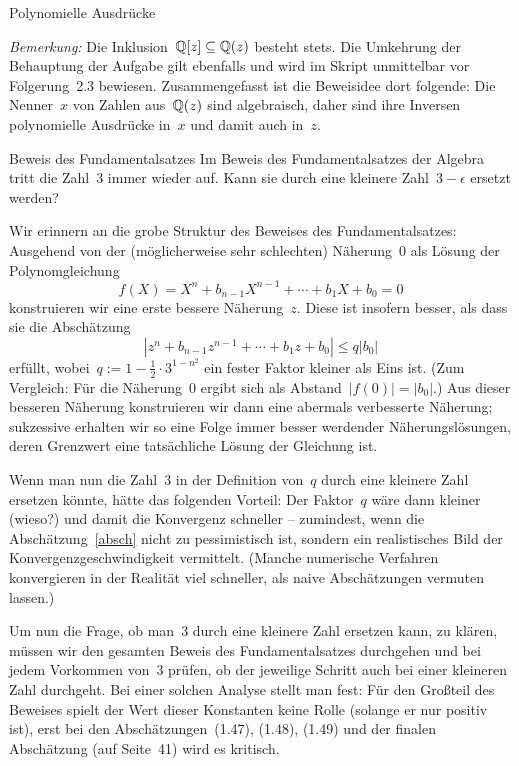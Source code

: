 \documentclass{algblatt}
\begin{document}
\begin{aufgabe}{Polynomielle Ausdrücke}
\begin{loesungE}
\emph{Bemerkung:} Die Inklusion~$\mathbb{Q}[z] \subseteq \mathbb{Q}(z)$ besteht stets. Die
Umkehrung der Behauptung der Aufgabe gilt ebenfalls und wird im Skript
unmittelbar vor Folgerung~2.3 bewiesen. Zusammengefasst ist die Beweisidee
dort folgende: Die Nenner~$x$ von Zahlen aus~$\mathbb{Q}(z)$ sind algebraisch, daher sind
ihre Inversen polynomielle Ausdrücke in~$x$ und damit auch in~$z$.
\end{loesungE}
\end{aufgabe}

\begin{aufgabe}{Beweis des Fundamentalsatzes}
Im Beweis des Fundamentalsatzes der Algebra tritt die Zahl~3 immer wieder auf.
Kann sie durch eine kleinere Zahl~$3-\epsilon$ ersetzt werden?
\begin{loesung}
Wir erinnern an die grobe Struktur des Beweises des Fundamentalsatzes:
Ausgehend von der (möglicherweise sehr schlechten) Näherung~$0$ als Lösung der
Polynomgleichung
\[ f(X) = X^n + b_{n-1}X^{n-1} + \cdots + b_1 X + b_0 = 0 \]
konstruieren wir eine erste bessere Näherung~$z$. Diese ist insofern besser,
als dass sie die Abschätzung
\begin{equation}\label{absch}
  |z^n + b_{n-1}z^{n-1} + \cdots + b_1 z + b_0| \leq q |b_0|
\end{equation}
erfüllt, wobei~$q := 1 - \frac{1}{2} \cdot 3^{1 - n^2}$ ein fester Faktor
kleiner als Eins ist. (Zum Vergleich: Für die Näherung~$0$ ergibt sich als
Abstand~$|f(0)| = |b_0|$.) Aus dieser besseren Näherung konstruieren wir dann
eine abermals verbesserte Näherung; sukzessive erhalten wir so eine Folge immer
besser werdender Näherungslösungen, deren Grenzwert eine tatsächliche Lösung
der Gleichung ist.

Wenn man nun die Zahl~$3$ in der Definition von~$q$ durch eine kleinere Zahl
ersetzen könnte, hätte das folgenden Vorteil: Der Faktor~$q$ wäre dann kleiner
(wieso?) und damit die Konvergenz schneller -- zumindest, wenn die
Abschätzung~\eqref{absch} nicht zu pessimistisch ist, sondern ein realistisches
Bild der Konvergenzgeschwindigkeit vermittelt. (Manche numerische Verfahren
konvergieren in der Realität viel schneller, als naive Abschätzungen vermuten
lassen.)

Um nun die Frage, ob man~$3$ durch eine kleinere Zahl ersetzen kann, zu klären,
müssen wir den gesamten Beweis des Fundamentalsatzes durchgehen und bei jedem
Vorkommen von~$3$ prüfen, ob der jeweilige Schritt auch bei einer kleineren
Zahl durchgeht. Bei einer solchen Analyse stellt man fest: Für den Großteil des
Beweises spielt der Wert dieser Konstanten keine Rolle (solange er nur positiv
ist), erst bei den Abschätzungen~(1.47), (1.48), (1.49) und der finalen
Abschätzung (auf Seite~41) wird es kritisch.


\end{loesung}
\end{aufgabe}
\end{document}
